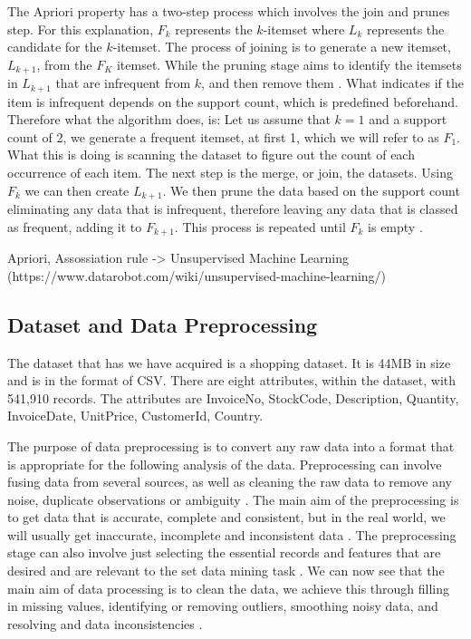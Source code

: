 \documentclass[a4paper,10pt]{article}
\begin{document}
The Apriori property has a two-step process which involves the join and prunes step. For this explanation, $F_k$ represents the $k$-itemset where $L_k$ represents the candidate for the $k$-itemset. The process of joining is to generate a new itemset, $L_{k+1}$, from the $F_K$ itemset. While the pruning stage aims to identify the itemsets in $L_{k+1}$ that are infrequent from $k$, and then remove them \cite{jingjingslides}. What indicates if the item is infrequent depends on the support count, which is predefined beforehand. Therefore what the algorithm does, is: Let us assume that $k=1$ and a support count of 2, we generate a frequent itemset, at first 1, which we will refer to as $F_1$. What this is doing is scanning the dataset to figure out the count of each occurrence of each item. The next step is the merge, or join, the datasets. Using $F_k$ we can then create $L_{k+1}$. We then prune the data based on the support count eliminating any data that is infrequent, therefore leaving any data that is classed as frequent, adding it to $F_{k+1}$. This process is repeated until $F_k$ is empty \cite{jingjingslides, han2011data}.

Apriori, Assossiation rule -> Unsupervised Machine Learning \cite{geron2019hands} 
(https://www.datarobot.com/wiki/unsupervised-machine-learning/)

\subsection{Dataset and Data Preprocessing}

The dataset that has we have acquired is a shopping dataset. It is 44MB in size and is in the format of CSV. There are eight attributes, within the dataset, with 541,910 records. The attributes are InvoiceNo, StockCode, Description, Quantity, InvoiceDate, UnitPrice, CustomerId, Country.

The purpose of data preprocessing is to convert any raw data into a format that is appropriate for the following analysis of the data. Preprocessing can involve fusing data from several sources, as well as cleaning the raw data to remove any noise, duplicate observations or ambiguity \cite{tan2016introduction}. The main aim of the preprocessing is to get data that is accurate, complete and consistent, but in the real world, we will usually get inaccurate, incomplete and inconsistent data \cite{han2011data}. The preprocessing stage can also involve just selecting the essential records and features that are desired and are relevant to the set data mining task \cite{tan2016introduction}. We can now see that the main aim of data processing is to clean the data, we achieve this through filling in missing values, identifying or removing outliers, smoothing noisy data, and resolving and data inconsistencies \cite{han2011data}.
\end{document}
